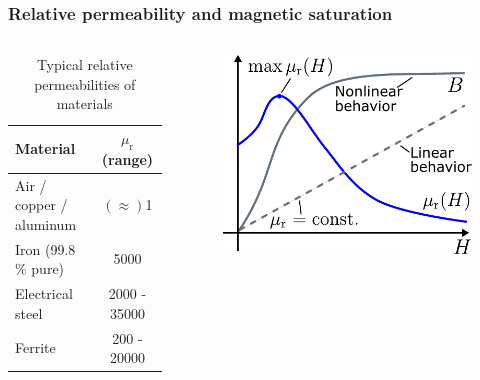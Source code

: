 \begin{frame}
	\frametitle{Relative permeability and magnetic saturation}
	\begin{columns}
		\begin{column}{0.575\textwidth}
			\begin{table}
            \centering
            \begin{tabular}{lc}
                \toprule
                Material & $\mu_{\mathrm{r}}$ (range)\\
                \midrule
                Air / copper / aluminum & $(\approx)$1 \\ 
                Iron (99.8\,\% pure) & 5000\\
                Electrical steel & 2000 - 35000\\
                Ferrite & 200 - 20000\\
                \bottomrule
            \end{tabular}
            \caption{Typical relative permeabilities of materials}
            \label{tab:rel_permeabilities}
            \end{table}
		\end{column}
        \hfill
		\begin{column}{0.425\textwidth}
			\begin{figure}
				\centering
				\includegraphics[height=0.5\textheight]{fig/lec02/Permeability_of_ferromagnet.pdf}

\end{figure}
\end{column}
\end{columns}
\end{frame}

